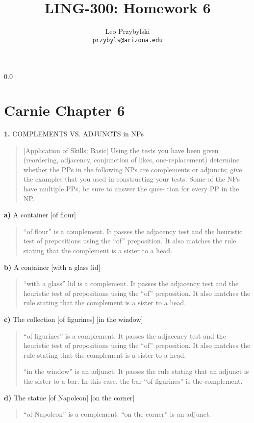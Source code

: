 \documentclass[11pt,notitlepage]{article}
\title{LING-300: Homework 6}
\author{Leo Przybylski\\
\texttt{przybyls@arizona.edu}}
\newcommand{\question}[2]{\textbf{#1.} #2}
\newcommand{\subquestion}[2]{\par\hspace{0.5cm} \textbf{#1)} #2}
\begin{document}
  \maketitle
  {\setlength{\baselineskip}%
           {0.0\baselineskip}
  \section*{Carnie Chapter 6}
  \hrulefill \par}

\question{1}{COMPLEMENTS VS. ADJUNCTS in NPs}
\begin{quote}
[Application of Skills; Basic]
Using the tests you have been given (reordering, adjacency,
conjunction of likes, one-replacement) determine whether the PPs in
the following NPs are complements or adjuncts; give the examples that
you used in constructing your tests. Some of the NPs have multiple
PPs, be sure to answer the ques- tion for every PP in the NP.
\end{quote}
\subquestion{a}{A container [of flour]}
\begin{quote}
``of flour'' is a complement. It passes the adjacency test and the
heuristic test of prepositions using the ``of'' preposition. It also
matches the rule stating that the complement is a sister to a head.
\end{quote}

\subquestion{b}{A container [with a glass lid]}
\begin{quote}
  ``with a glass'' lid is a complement. It passes the adjacency test and the
heuristic test of prepositions using the ``of'' preposition. It also
matches the rule stating that the complement is a sister to a head.
\end{quote}

\subquestion{c}{The collection [of figurines] [in the window]}
\begin{quote}

 ``of figurines'' is a complement. It passes the adjacency test and the
heuristic test of prepositions using the ``of'' preposition. It also
matches the rule stating that the complement is a sister to a head.

``in the window'' is an adjunct. It passes the rule stating that an
adjunct is the sister to a bar. In this case, the bar ``of figurines'' is the complement.
  
\end{quote}

\subquestion{d}{The statue [of Napoleon] [on the corner]}
\begin{quote}
  ``of Napoleon'' is a complement. ``on the corner'' is an adjunct.
\end{quote}
\end{document}
